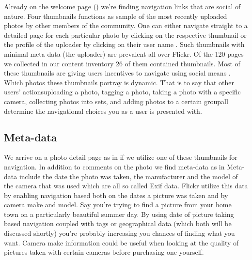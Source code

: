 Already on the welcome page ()
we're finding navigation links that are social of
nature. Four thumbnails functions as sample of the most recently uploaded
photos by other members of the community. One can either navigate straight to
a detailed page for each particular photo by clicking on the respective
thumbnail 
or the profile of the uploader by clicking on their user
name . Such thumbnails
with minimal meta data (the uploader) are prevalent all over Flickr. Of the
120 pages we collected in our content inventory 26 of them contained
thumbnails. Most of these thumbnails
are giving users incentives to navigate using social means%
.
Which photos these thumbnails portray is dynamic. That is to say that other
users' actions\dash{}uploading a photo, tagging a photo, taking a photo with a
specific camera, collecting photos into sets, and adding photos to a certain
group\dash{}all determine the navigational choices you as a user is
presented with.

\subsection{Meta-data}

We arrive on a photo detail page as in
if we utilize one of these thumbnails for navigation. In addition to comments
on the photo we find meta-data as in 
Meta-data include the date the photo was taken, the manufacturer and the model
of the camera that was used which are all so called Exif%
data. Flickr utilize this data by enabling navigation based both on the
dates a picture was taken and by camera make and model. Say you're trying to
find a picture from your home town on a particularly beautiful summer day. By
using date of picture taking based navigation coupled with tags or
geographical data (which both will be discussed shortly) you're probably
increasing you chances of finding what you want. Camera make information could
be useful when looking at the quality of pictures taken with certain cameras
before purchasing one yourself.

